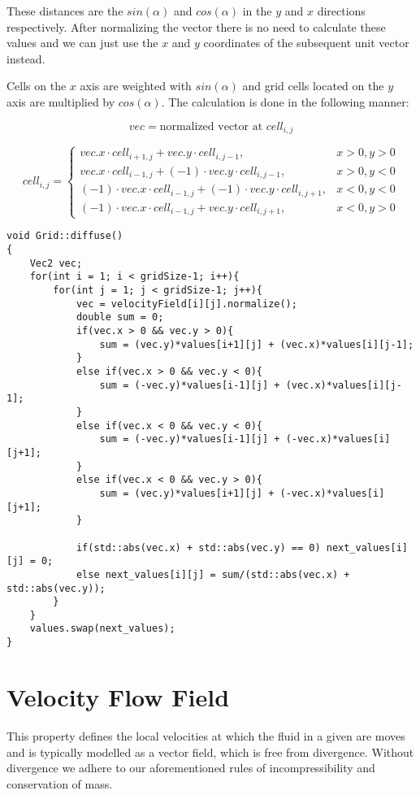 \documentclass[15pt, titlepage]{article}
\begin{document}
These distances are the $sin(\alpha)$ and $cos(\alpha)$ in the $y$ and $x$ directions respectively. After normalizing the vector there is no need to calculate these values and we can just use the $x$ and $y$ coordinates of the subsequent unit vector instead.

Cells on the $x$ axis are weighted with $sin(\alpha)$ and grid cells located on the $y$ axis are multiplied by $cos(\alpha)$. The calculation is done in the following manner:

\[
	vec = \text{normalized vector at }cell_{i, j}
\]

\[
	cell_{i, j} = \begin{cases}
	vec.x \cdot cell_{i+1, j} + vec.y \cdot cell_{i, j-1}, & x > 0, y > 0 \\
	vec.x \cdot cell_{i-1, j} + (-1)\cdot vec.y \cdot cell_{i, j-1}, & x > 0, y < 0 \\
	(-1) \cdot vec.x \cdot cell_{i-1, j} + (-1) \cdot vec.y \cdot cell_{i, j+1}, & x < 0, y < 0 \\
	(-1) \cdot vec.x \cdot cell_{i-1, j} + vec.y \cdot cell_{i, j+1}, & x < 0, y > 0
	\end{cases}
\]

\begin{lstlisting}
void Grid::diffuse()
{
    Vec2 vec;
    for(int i = 1; i < gridSize-1; i++){
        for(int j = 1; j < gridSize-1; j++){
            vec = velocityField[i][j].normalize();
            double sum = 0;
            if(vec.x > 0 && vec.y > 0){
                sum = (vec.y)*values[i+1][j] + (vec.x)*values[i][j-1];
            }
            else if(vec.x > 0 && vec.y < 0){
                sum = (-vec.y)*values[i-1][j] + (vec.x)*values[i][j-1];
            }
            else if(vec.x < 0 && vec.y < 0){
                sum = (-vec.y)*values[i-1][j] + (-vec.x)*values[i][j+1];
            }
            else if(vec.x < 0 && vec.y > 0){
                sum = (vec.y)*values[i+1][j] + (-vec.x)*values[i][j+1];
            }

            if(std::abs(vec.x) + std::abs(vec.y) == 0) next_values[i][j] = 0;
            else next_values[i][j] = sum/(std::abs(vec.x) + std::abs(vec.y));
        }
    }
    values.swap(next_values);
}
\end{lstlisting}

\section{Velocity Flow Field}

This property defines the local velocities at which the fluid in a given are moves and is typically modelled as a vector field, which is free from divergence. Without divergence we adhere to our aforementioned rules of incompressibility and conservation of mass.
\end{document}
